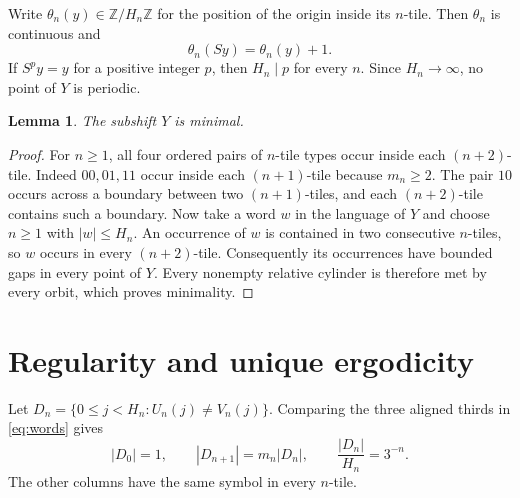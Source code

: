 \documentclass[11pt]{article}
\newtheorem{lemma}[theorem]{Lemma}
\newcommand{\Z}{\mathbb Z}
\begin{document}
Write $\theta_n(y)\in\Z/H_n\Z$ for the position of the origin inside its $n$-tile. Then $\theta_n$ is continuous and
\begin{equation}\label{eq:phase}
 \theta_n(Sy)=\theta_n(y)+1.
\end{equation}
If $S^py=y$ for a positive integer $p$, then $H_n\mid p$ for every $n$. Since $H_n\to\infty$, no point of $Y$ is periodic.

\begin{lemma}\label{lem:minimal}
The subshift $Y$ is minimal.
\end{lemma}
\begin{proof}
For $n\geq1$, all four ordered pairs of $n$-tile types occur inside each $(n+2)$-tile. Indeed $00,01,11$ occur inside each $(n+1)$-tile because $m_n\geq2$. The pair $10$ occurs across a boundary between two $(n+1)$-tiles, and each $(n+2)$-tile contains such a boundary. Now take a word $w$ in the language of $Y$ and choose $n\geq1$ with $|w|\leq H_n$. An occurrence of $w$ is contained in two consecutive $n$-tiles, so $w$ occurs in every $(n+2)$-tile. Consequently its occurrences have bounded gaps in every point of $Y$. Every nonempty relative cylinder is therefore met by every orbit, which proves minimality.
\end{proof}

\section{Regularity and unique ergodicity}
Let $D_n=\{0\leq j<H_n:U_n(j)\ne V_n(j)\}$. Comparing the three aligned thirds in \eqref{eq:words} gives
\begin{equation}\label{eq:mismatch}
 |D_0|=1,\qquad |D_{n+1}|=m_n|D_n|,\qquad
 \frac{|D_n|}{H_n}=3^{-n}.
\end{equation}
The other columns have the same symbol in every $n$-tile.
\end{document}
